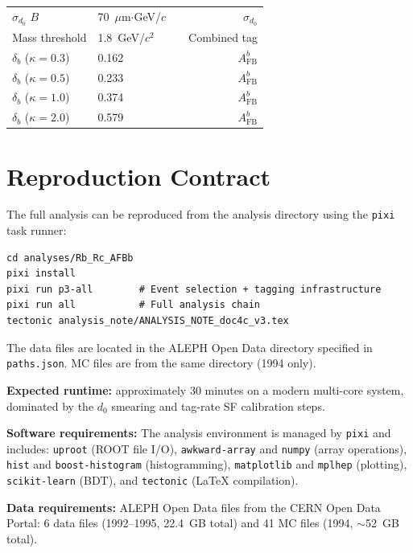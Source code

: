 \documentclass[11pt,a4paper]{article}
\begin{document}
\begin{table}[htbp]
\begin{tabular}{lllr}
$\sigma_{d_0}$ $B$ & 70~$\mu$m$\cdot$GeV/$c$ & \cite{ALEPH:Rb:precise} & $\sigma_{d_0}$ \\
Mass threshold & 1.8~GeV/$c^2$ & \cite{ALEPH:Rb:1996} & Combined tag \\
$\delta_b$ ($\kappa = 0.3$) & 0.162 & \cite{LEP:EWWG:2005} & $A_\text{FB}^b$ \\
$\delta_b$ ($\kappa = 0.5$) & 0.233 & \cite{LEP:EWWG:2005} & $A_\text{FB}^b$ \\
$\delta_b$ ($\kappa = 1.0$) & 0.374 & \cite{LEP:EWWG:2005} & $A_\text{FB}^b$ \\
$\delta_b$ ($\kappa = 2.0$) & 0.579 & \cite{LEP:EWWG:2005} & $A_\text{FB}^b$ \\
\bottomrule
\end{tabular}
\end{table}

\section{Reproduction Contract}
\label{app:reproduction}

The full analysis can be reproduced from the analysis directory
using the \texttt{pixi} task runner:

\begin{verbatim}
cd analyses/Rb_Rc_AFBb
pixi install
pixi run p3-all        # Event selection + tagging infrastructure
pixi run all           # Full analysis chain
tectonic analysis_note/ANALYSIS_NOTE_doc4c_v3.tex
\end{verbatim}

\noindent
The data files are located in the ALEPH Open Data directory
specified in \texttt{paths.json}.
MC files are from the same directory (1994 only).

\noindent
\textbf{Expected runtime:} approximately 30 minutes on a modern
multi-core system, dominated by the $d_0$ smearing and tag-rate
SF calibration steps.

\noindent
\textbf{Software requirements:} The analysis environment is
managed by \texttt{pixi} and includes: \texttt{uproot} (ROOT file
I/O), \texttt{awkward-array} and \texttt{numpy} (array operations),
\texttt{hist} and \texttt{boost-histogram} (histogramming),
\texttt{matplotlib} and \texttt{mplhep} (plotting),
\texttt{scikit-learn} (BDT), and \texttt{tectonic} (LaTeX
compilation).

\noindent
\textbf{Data requirements:} ALEPH Open Data files from the CERN
Open Data Portal: 6 data files (1992--1995, 22.4~GB total) and
41 MC files (1994, $\sim$52~GB total).
\end{document}
